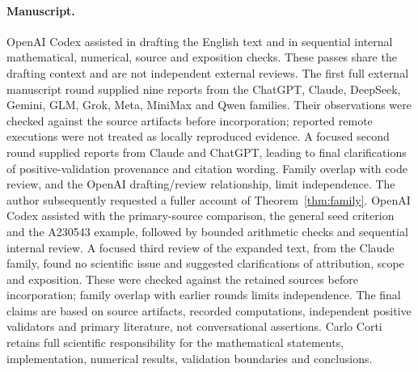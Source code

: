\documentclass[11pt,a4paper]{article}
\theoremstyle{remark}
\begin{document}
\paragraph{Manuscript.}
OpenAI Codex assisted in drafting the English text and in sequential internal
mathematical, numerical, source and exposition checks. These passes share the
drafting context and are not independent external reviews. The first full
external manuscript round supplied nine reports from the ChatGPT, Claude,
DeepSeek, Gemini, GLM, Grok, Meta, MiniMax and Qwen families. Their observations
were checked against the source artifacts before incorporation; reported
remote executions were not treated as locally reproduced evidence.
A focused second round supplied reports from Claude and ChatGPT, leading
to final clarifications of positive-validation provenance and citation wording.
Family overlap with code review, and the OpenAI drafting/review relationship,
limit independence.
The author subsequently requested a fuller account of Theorem~\ref{thm:family}.
OpenAI Codex assisted with the primary-source comparison, the general seed
criterion and the A230543 example, followed by bounded arithmetic checks
and sequential internal review. A focused third review of the expanded
text, from the Claude family, found no scientific issue and suggested
clarifications of attribution, scope and exposition. These were checked
against the retained sources before incorporation; family overlap with
earlier rounds limits independence. The final claims
are based on source artifacts, recorded computations, independent positive
validators and primary literature, not conversational assertions.
Carlo Corti retains full scientific responsibility for the mathematical
statements, implementation, numerical results, validation boundaries and
conclusions.
\end{document}

